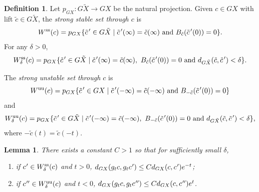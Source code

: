\documentclass[10pt]{amsart}
\let\sep\mid
\newcommand{\cpr}{c\mkern1mu'}
\newcommand{\tcpr}{\tilde c\mkern2mu'}
\newcommand{\sts}{\mathrm{ss}}
\newcommand{\uu}{\mathrm{uu}}
\newtheorem{lem}[thm]{Lemma}
\theoremstyle{definition}
\newtheorem{defn}[thm]{Definition}
\numberwithin{equation}{section}
\begin{document}
\begin{defn}
Let $p_{GX}:G\tilde X \to GX$ be the natural projection. Given $c\in GX$ with lift $\tilde c\in G\tilde X$, the \emph{strong stable set through $c$} is
\[ W^{\sts}(c) = p_{GX}\{ \tcpr \in G\tilde X \sep \tcpr(\infty) = \tilde c(\infty) \mbox{ and } B_{\tilde c}(\tcpr(0)) = 0\}. \]
For any $\delta>0$,
\[ W^{\sts}_\delta(c) = p_{GX}\{ \tcpr \in G\tilde X \sep \tcpr(\infty) = \tilde c(\infty), \ B_{\tilde c}(\tcpr(0)) = 0 \mbox{ and } d_{G\tilde X}(\tilde c,\tcpr)<\delta \}. \]

The \emph{strong unstable set through $c$} is
\[W^{\uu}(c) = p_{GX}\{ \tcpr \in GX \sep \tcpr(-\infty) = \tilde c(-\infty) \mbox{ and } B_{-\tilde c}(\tcpr(0)) = 0\}\] and \[ W^{\uu}_\delta(c) = p_{GX}\{ \tcpr \in G\tilde X \sep \tcpr(-\infty) = \tilde c(-\infty), \ B_{-\tilde c}(\tcpr(0)) = 0 \mbox{ and } d_{G\tilde X}(\tilde c,\tcpr)<\delta \},\] where $-\tilde c(t) = \tilde c(-t)$.
\end{defn}

\begin{lem}\label{lem:contract}
There exists a constant $C>1$ so that for sufficiently small $\delta$,
\begin{enumerate}
\item if $\cpr \in W^{\sts}_\delta(c)$ and $t>0$, $d_{GX}(g_tc, g_t\cpr) \leq C d_{GX}(c, \cpr) e^{-t}$;
\item if $\cpr' \in W^{\uu}_\delta(c)$ and $t<0$, $d_{GX}(g_tc, g_t\cpr') \leq C d_{GX}(c, \cpr') e^{t}$.
\end{enumerate}
\end{lem}
\end{document}

